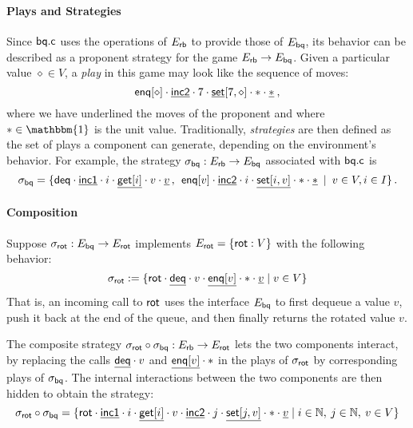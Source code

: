 \documentclass[acmsmall,review,anonymous]{acmart}\settopmatter{printfolios=true,printccs=false,printacmref=false}
\begin{document}
\paragraph{Plays and Strategies}

Since $ \mathsf{bq.c} $
uses the operations of $E_{ \mathsf{rb} }$ to
provide those of $E_{ \mathsf{bq} }$,
its behavior
can be described as a proponent strategy for the game
$E_{ \mathsf{rb} } \rightarrow E_{ \mathsf{bq} }$.
Given a particular value $\diamond \in V$,
a \emph{play} in this game may look like the sequence of moves:
\[
   \mathsf{enq} [\diamond] \cdot
  \underline{ \mathsf{inc2} } \cdot
  7 \cdot
  \underline{ \mathsf{set} }[7, \diamond] \cdot
  * \cdot
  \underline*
  \:,
\]
where we have underlined the moves of the proponent
and where $* \in \mathbbm{1}$ is the unit value.
Traditionally,
\emph{strategies} are then defined as
the set of plays a component can generate,
depending on the environment's behavior.
For example,
the strategy
$\sigma_{ \mathsf{bq} } : E_{ \mathsf{rb} } \rightarrow E_{ \mathsf{bq} }$
associated with $ \mathsf{bq.c} $ is
\[
  \sigma_{ \mathsf{bq} } =
  \{ 
     \mathsf{deq}  \cdot
    \underline{ \mathsf{inc1} } \cdot
    i \cdot
    \underline{ \mathsf{get} [i]} \cdot
    v \cdot
    \underline{v} \,, \:\:
     \mathsf{enq} [v] \cdot
    \underline{ \mathsf{inc2} } \cdot
    i \cdot
    \underline{ \mathsf{set} [i, v]} \cdot
    * \cdot
    \underline*
  \:\mid\:
    v \in V, i \in I
  \}
  \,.
\]

\paragraph{Composition} %

Suppose %
$\sigma_{ \mathsf{rot} } : E_{ \mathsf{bq} } \rightarrow E_{ \mathsf{rot} }$
implements %
$E_{ \mathsf{rot} } = \{  \mathsf{rot}  : V \}$
with the following behavior:
\[
  \sigma_{ \mathsf{rot} } := \{
     \mathsf{rot}  \cdot
    \underline{ \mathsf{deq} } \cdot
    v \cdot
    \underline{ \mathsf{enq} [v]} \cdot
    * \cdot
    \underline{v}
    \mid v \in V
  \}
\]
That is,
an incoming call to $ \mathsf{rot} $
uses the interface $E_{ \mathsf{bq} }$
to first dequeue a value $v$,
push it back at the end of the queue,
and then finally returns the rotated value $v$.

The composite strategy
$\sigma_{ \mathsf{rot} } \circ \sigma_{ \mathsf{bq} } :
 E_{ \mathsf{rb} } \rightarrow E_{ \mathsf{rot} }$
lets the two components interact,
by replacing the calls
$\underline{ \mathsf{deq} } \cdot v$
and
$\underline{ \mathsf{enq} [v]} \cdot *$
in the plays of $\sigma_{ \mathsf{rot} }$
by corresponding plays of $\sigma_{ \mathsf{bq} }$.
The internal interactions between the two components
are then hidden to obtain the strategy:
\[
  \sigma_{ \mathsf{rot} } \circ \sigma_{ \mathsf{bq} } =
  \{
     \mathsf{rot}  \cdot
    \underline{ \mathsf{inc1} } \cdot i \cdot
    \underline{ \mathsf{get} [i]} \cdot v \cdot
    \underline{ \mathsf{inc2} } \cdot j \cdot
    \underline{ \mathsf{set} [j,v]} \cdot * \cdot
    \underline{v}
  \mid
    i \in \mathbb{N}, \:
    j \in \mathbb{N}, \:
    v \in V
  \}
\]
\end{document}
